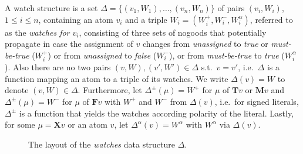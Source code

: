 \documentclass{vutinfth} %
\theoremstyle{example}
\theoremstyle{definition}
\theoremstyle{theorem}
\theoremstyle{lemma}
\theoremstyle{corollary}
\newcommand{\mbt}{must-be-true}
\newcommand{\bT}{\mathbf{T}}
\newcommand{\bM}{\mathbf{M}}
\newcommand{\bF}{\mathbf{F}}
\newcommand{\bX}{\mathbf{X}}
\newcommand{\sgl}{\mu}
\begin{document}

A watch structure is a set $\Delta = \{ (v_1, W_1), \ldots, (v_n, W_n) \}$ of pairs $(v_i, W_i)$, $1 \leq i \leq n$, containing an atom $v_i$ and a triple $W_i = (W_i^+, W_i^-, W_i^\alpha)$, referred to as the \emph{watches for $v_i$}, consisting of three sets of nogoods that potentially propagate in case the assignment of $v$ changes from \emph{unassigned} to \emph{true} or \emph{\mbt} ($W_i^+$) or from \emph{unassigned} to \emph{false} ($W_i^-$), or from \emph{\mbt} to \emph{true} ($W_i^\alpha$). Also there are no two pairs $(v, W), (v', W') \in \Delta$ s.t.~$v = v'$, i.e.~$\Delta$ is a function mapping an atom to a triple of its watches. We write $\Delta(v) = W$ to denote $(v, W) \in \Delta$. Furthermore, let $\Delta^\pm(\sgl) = W^+$ for $\sgl$ of $\bT v$ or $\bM v$ and $\Delta^\pm(\sgl) = W^-$ for $\sgl$ of $\bF v$ with $W^+$ and $W^-$ from $\Delta(v)$, i.e.~for signed literals, $\Delta^\pm$ is a function that yields the watches according polarity of the literal. Lastly, for some $\sgl = \bX v$ or an atom $v$, let $\Delta^\alpha(v) = W^\alpha$ with $W^\alpha$ via $\Delta(v)$.

\begin{figure}[h]
  \centering
{}
  \caption{The layout of the \emph{watches} data structure $\Delta$.}
  \label{fig:watches} %
\end{figure}
\end{document}
